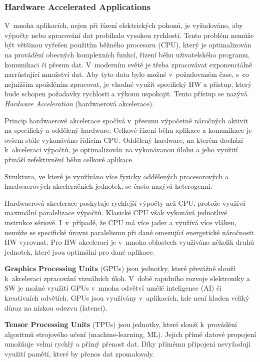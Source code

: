 \documentclass[a4paper, twoside, 11pt]{article}
\begin{document}
		\subsubsection{Hardware Accelerated Applications}\label{subsec:hardware-accelerated-applications}
		V~mnoha aplikacích, nejen při řízení elektrických pohonů, je vyžadováno, aby výpočty nebo zpracování dat probíhalo vysokou rychlostí. Tento problém nemůže být většinou vyřešen použitím běžného procesoru (CPU), který je optimalizován na provádění obecných komplexních funkcí, řízení běhu uživatelského programu, komunikaci či přesun dat. V~moderním světě je třeba zpracovávat exponenciálně narrůstající množství dat. Aby tyto data bylo možné v~požadovaném čase, s~co nejnižším zpožděním zpracovat, je vhodné využít specifický HW a přístup, který bude schopen požadavky rychlosti a výkonu uspokojit. Tento přístup se nazývá \textit{Hardware Acceleration} (hardwaerová akcelerace). \cite{xilinx-accelerated-computing}\par
		Princip hardwaerové akcelerace spočívá v~přesunu výpočetně náročných aktivit na specifický a oddělený hardware. Celkové řízení běhu aplikace a komunikace je ovšem stále vykonáváno řídícím CPU. Oddělený hardware, na kterém dochází k~akceleraci výpočtů, je optimalizován na vykonávanou úlohu a jeho využití přináší zefektivnění běhu celkové aplikace. \cite{xilinx-accelerated-computing}\par
		Struktura, ve které je využíváno více fyzicky oddělených procesorových a hardwaerových akceleračních jednotek, se často nazývá heterogenní. \cite{xilinx-accelerated-computing}\par
		Hardwaerová akcelerace poskytuje rychlejší výpočty než CPU, protože využívá maximální paralelizace výpočtů. Klasické CPU však vykonává jednotlivé instrukce sériově. I~v~případě, že CPU má více jader a využívá více vláken, nemůže se specifické úrovni paralelismu při dané omezující energetické náročnosti HW vyrovnat.
		Pro HW akceleraci je v~mnoha oblastech využíváno několik druhů jednotek, které jsou optimální pro dané aplikace.\par
		\textbf{Graphics Processing Units} (GPUs) jsou jednotky, které převážně slouží k~akceleraci zpracování vizuálních úloh. V~době rapidního rozvoje elektroniky a SW je možné využití GPUs v~mnoha odvětví umělé inteligence (AI) či kreativních odvětích. GPUs jsou využívány v~aplikacích, kde není kladen veliký důraz na nízkou odezvu (latenci). \cite{xilinx-accelerated-computing}\par
		\textbf{Tensor Processing Units} (TPUs) jsou jednotky, které slouží k~provádění algoritmů strojového učení (machine-learning, ML). Jejich přímé datové propojení umožňuje velmi rychlý a přímý přenost dat. Díky přímému připojení nevyžadují využití pamětí, které by přenos dat zpomalovaly. \cite{xilinx-accelerated-computing}\par
\end{document}
